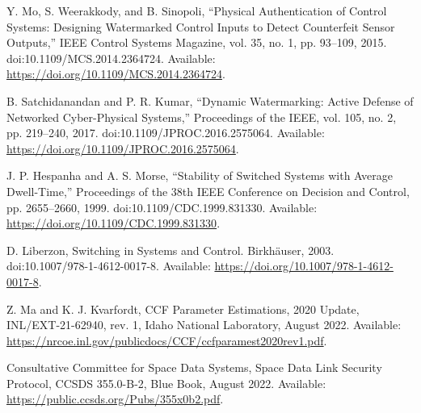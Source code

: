  Y. Mo, S. Weerakkody, and B. Sinopoli, ``Physical Authentication of Control Systems: Designing Watermarked Control Inputs to Detect Counterfeit Sensor Outputs,'' IEEE Control Systems Magazine, vol. 35, no. 1, pp. 93--109, 2015. doi:10.1109/MCS.2014.2364724. Available: \url{https://doi.org/10.1109/MCS.2014.2364724}.

 B. Satchidanandan and P. R. Kumar, ``Dynamic Watermarking: Active Defense of Networked Cyber-Physical Systems,'' Proceedings of the IEEE, vol. 105, no. 2, pp. 219--240, 2017. doi:10.1109/JPROC.2016.2575064. Available: \url{https://doi.org/10.1109/JPROC.2016.2575064}.

 J. P. Hespanha and A. S. Morse, ``Stability of Switched Systems with Average Dwell-Time,'' Proceedings of the 38th IEEE Conference on Decision and Control, pp. 2655--2660, 1999. doi:10.1109/CDC.1999.831330. Available: \url{https://doi.org/10.1109/CDC.1999.831330}.

 D. Liberzon, Switching in Systems and Control. Birkh\"{a}user, 2003. doi:10.1007/978-1-4612-0017-8. Available: \url{https://doi.org/10.1007/978-1-4612-0017-8}.

 Z. Ma and K. J. Kvarfordt, CCF Parameter Estimations, 2020 Update, INL/EXT-21-62940, rev. 1, Idaho National Laboratory, August 2022. Available: \url{https://nrcoe.inl.gov/publicdocs/CCF/ccfparamest2020rev1.pdf}.

 Consultative Committee for Space Data Systems, Space Data Link Security Protocol, CCSDS 355.0-B-2, Blue Book, August 2022. Available: \url{https://public.ccsds.org/Pubs/355x0b2.pdf}.
